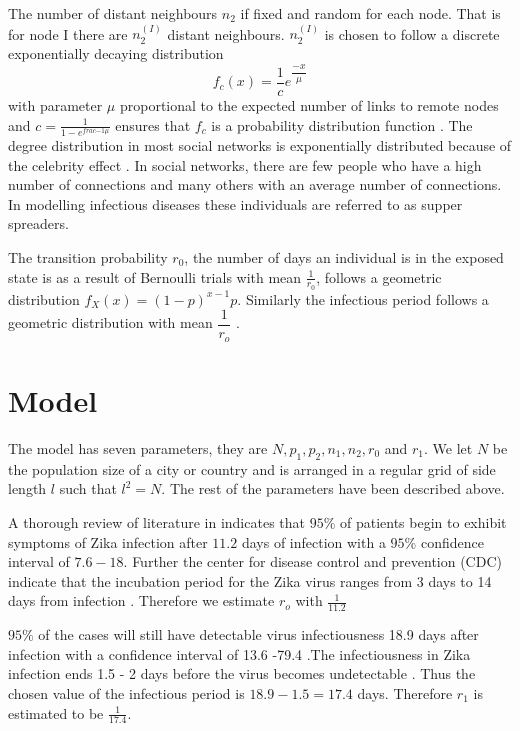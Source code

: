 The number of distant neighbours $n_2$ if fixed and random for each node. That is for node I there are $n_2^ {(I)} $ distant neighbours. $n_2^ {(I)} $ is chosen to follow a discrete exponentially decaying distribution 
\begin{equation} 
f_c (x) = \dfrac{1}{c} e^{\dfrac{-x}{\mu}} \end{equation} 
with parameter $\mu$ proportional to the expected number of links to remote nodes and $c = \frac{1}{1- e^{frac{-1}{\mu}}}$ ensures that $f_c$ is a probability distribution function \citep{fu2013propagation}. The degree distribution in most social networks is exponentially distributed because of the celebrity effect \citep{estrada2015first}. In social networks, there are few people who have a high number of connections and many others with an average number of connections. In modelling infectious diseases these individuals are referred to as supper spreaders.

The transition probability $r_0$, the number of days an individual is in the exposed state is as a result of Bernoulli trials with mean $\frac{1}{r_0}$, follows a geometric distribution $f_X (x) = (1-p) ^ {x-1} p$. Similarly the infectious period follows a geometric distribution with mean $\dfrac{1}{r_o}$ \citep{fu2013propagation}.

\section{Model}
The model has seven parameters, they are $N, p_1, p_2, n_1, n_2, r_0$ and $r_1$. We let $N$ be the population size of a city or country and is arranged in a regular grid of side length $l $ such that $l^2 = N$. The rest of the parameters have been described above.

A thorough review of literature in \cite{lessler2016times} indicates that $95 \%$ of patients begin to exhibit symptoms of Zika infection after $11.2$ days of infection with a $95 \%$ confidence interval of $7.6 -18$. Further the center for disease control and prevention (CDC) indicate that the incubation period for the Zika virus ranges from 3 days to 14 days from infection \citep{krow2017estimated}. Therefore we estimate $r_o$ with $\frac{1}{11.2}$

$95\%$ of the cases will still have detectable virus infectiousness 18.9 days after infection with a confidence interval of 13.6 -79.4 \citep{lessler2016times}.The infectiousness in Zika infection ends 1.5 - 2 days before the virus becomes undetectable \citep{funk2016comparative}. Thus the chosen value of the infectious period is $18.9 - 1.5 = 17.4$ days. Therefore $r_1$ is estimated to be $\frac{1}{17.4}$.

